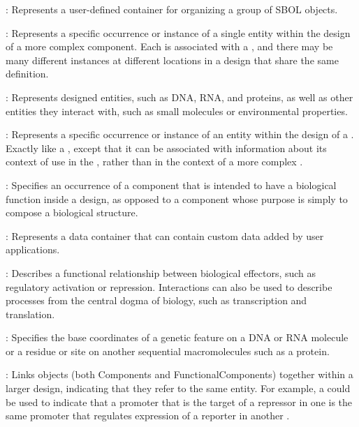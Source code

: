 \begin{description}

\item \emph{}:
Represents a user-defined container for organizing a group of SBOL objects.

\item \emph{}:
Represents a specific occurrence or instance of a single entity within the design of a more complex component.
Each  is associated with a , and there may be many different instances at different locations in a design that share the same definition.

\item \emph{}: Represents designed entities, such as DNA, RNA, and proteins, as well as other entities they interact with, such as small molecules or environmental properties.

\item \emph{}:
Represents a specific occurrence or instance of an entity within the design of a .
Exactly like a , except that it can be associated with information about its context of use in the , rather than in the context of a more complex .

\item \emph{}:
Specifies an occurrence of a component that is intended to have a biological function inside a design, as opposed to a component whose purpose is simply to compose a biological structure. 

\item \emph{}:
Represents a data container that can contain custom data added by user applications.

\item \emph{}:
Describes a functional relationship between biological effectors, such as regulatory activation or repression.  Interactions can also be used to describe processes from the central dogma of biology, such as transcription and translation.

\item \emph{}:
Specifies the base coordinates of a genetic feature on a DNA or RNA molecule or a residue or site on another sequential macromolecules such as a protein.

\item \emph{}:
Links  objects (both Components and FunctionalComponents) together within a larger design, indicating that they refer to the same entity.
For example, a  could be used to indicate that a promoter that is the target of a repressor in one  is the same promoter that regulates expression of a reporter in another .


\end{description}
